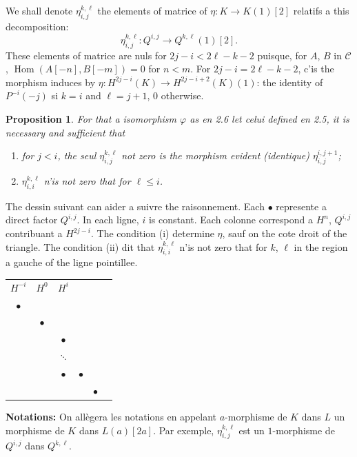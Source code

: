 \documentclass[11pt,a4paper]{article}
\theoremstyle{plain}
\newtheorem{proposition}[theorem]{Proposition}
\theoremstyle{definition}
\DeclareMathOperator{\Hom}{Hom}
\newcommand{\cC}{\mathscr{C}}
\begin{document}
We shall denote $\eta^{k,\ell}_{i,j}$ the elements of matrice of $\eta \colon K \to K(1)[2]$ relatifs a this decomposition:
\[
\eta^{k,\ell}_{i,j} \colon Q^{i,j} \to Q^{k,\ell}(1)[2].
\]
These elements of matrice are nuls for $2j-i < 2\ell-k-2$ puisque, for $A$, $B$ in $\cC$, $\Hom(A[-n], B[-m]) = 0$ for $n < m$. For $2j-i = 2\ell-k-2$, c'is the morphism induces by $\eta \colon H^{2j-i}(K) \to H^{2j-i+2}(K)(1)$: the identity of $P^{-i}(-j)$ si $k=i$ and $\ell=j+1$, $0$ otherwise.

\begin{proposition}\label{prop:2.7}
For that a isomorphism $\varphi$ as en \emph{2.6} let celui defined en \emph{2.5}, it is necessary and sufficient that
\begin{enumerate}[label=\textup{(\roman*)}]
\item for $j < i$, the seul $\eta^{k,\ell}_{i,j}$ not zero is the morphism evident (identique) $\eta^{i,j+1}_{i,j}$;
\item $\eta^{k,\ell}_{i,i}$ n'is not zero that for $\ell \leqslant i$.
\end{enumerate}
\end{proposition}

The dessin suivant can aider a suivre the raisonnement. Each $\bullet$ represente a direct factor $Q^{i,j}$. In each ligne, $i$ is constant. Each colonne correspond a $H^n$, $Q^{i,j}$ contribuant a $H^{2j-i}$. The condition (i) determine $\eta$, sauf on the cote droit of the triangle. The condition (ii) dit that $\eta^{k,\ell}_{i,i}$ n'is not zero that for $k$, $\ell$ in the region a gauche of the ligne pointillee.

\begin{center}
\begin{tabular}{cccccc}
$H^{-i}$ & $H^0$ & $H^i$ & & & \\[4pt]
$\bullet$ & & & & & \\[-2pt]
& $\bullet$ & & & & \\[-2pt]
& & $\bullet$ & & & \\[-2pt]
& & $\ddots$ & & & \\[-2pt]
& & $\bullet$ & $\bullet$ & & \\[-2pt]
& & & & $\bullet$ &
\end{tabular}
\end{center}

\medskip
\noindent\textbf{Notations:} On all\`egera les notations en appelant $a$-morphisme de $K$ dans $L$ un morphisme de $K$ dans $L(a)[2a]$. Par exemple, $\eta^{k,\ell}_{i,j}$ est un $1$-morphisme de $Q^{i,j}$ dans $Q^{k,\ell}$.
\end{document}
